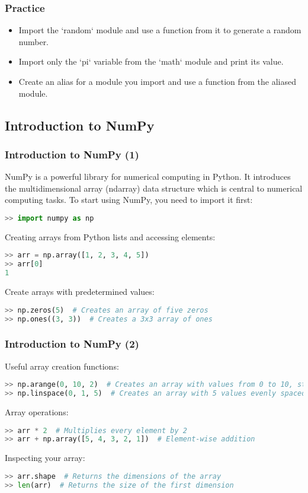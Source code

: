 \begin{frame}[fragile]
 \frametitle{Practice}
 \begin{itemize}
  \item Import the `random` module and use a function from it to generate a random number.\pause
  \item Import only the `pi` variable from the `math` module and print its value.\pause
  \item Create an alias for a module you import and use a function from the aliased module.
 \end{itemize}
\end{frame}

\subsection*{Introduction to NumPy}
\begin{frame}[fragile]
  \frametitle{Introduction to NumPy (1)}
  NumPy is a powerful library for numerical computing in Python. It introduces the multidimensional array (ndarray) data structure which is central to numerical computing tasks. To start using NumPy, you need to import it first:
  \begin{lstlisting}[language=Python]
>> import numpy as np
  \end{lstlisting}\pause
  Creating arrays from Python lists and accessing elements:
  \begin{lstlisting}[language=Python]
>> arr = np.array([1, 2, 3, 4, 5])
>> arr[0]
1
  \end{lstlisting}\pause
  Create arrays with predetermined values:
  \begin{lstlisting}[language=Python]
>> np.zeros(5)  # Creates an array of five zeros
>> np.ones((3, 3))  # Creates a 3x3 array of ones
  \end{lstlisting}
\end{frame}

\begin{frame}[fragile]
  \frametitle{Introduction to NumPy (2)}
  Useful array creation functions:
  \begin{lstlisting}[language=Python]
>> np.arange(0, 10, 2)  # Creates an array with values from 0 to 10, step 2
>> np.linspace(0, 1, 5)  # Creates an array with 5 values evenly spaced between 0 and 1
  \end{lstlisting}\pause
  Array operations:
  \begin{lstlisting}[language=Python]
>> arr * 2  # Multiplies every element by 2
>> arr + np.array([5, 4, 3, 2, 1])  # Element-wise addition
  \end{lstlisting}\pause
  Inspecting your array:
  \begin{lstlisting}[language=Python]
>> arr.shape  # Returns the dimensions of the array
>> len(arr)  # Returns the size of the first dimension
  \end{lstlisting}
\end{frame}

